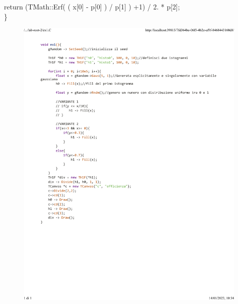 \documentclass[10pt,a4paper]{article}
\begin{document}
	return (TMath::Erf(  ( x[0] - p[0] ) / p[1] ) +1) / 2. * p[2];\\
\}
\newpage
\begin{figure}[h!]
	\centering
	\includegraphics[width=1.\linewidth]{_..._lab-root-2_ex1.C}
	\caption{}
	\label{fig:4}
\end{figure}
\newpage
\end{document}
